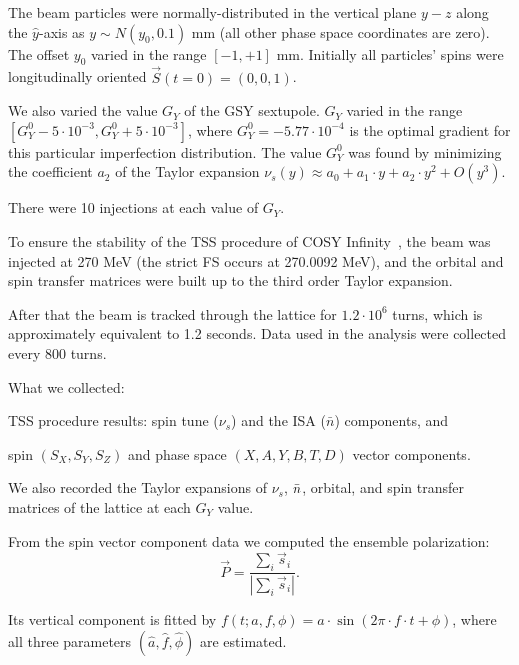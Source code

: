 The beam particles were normally-distributed in the vertical plane $y-z$ along the $\hat y$-axis
as $y\sim N(y_0, 0.1)$ mm (all other phase space coordinates are zero). The offset $y_0$ varied in the
range $[-1, +1]$ mm. Initially all particles' spins were longitudinally oriented $\vec S(t=0) = (0,0,1)$.

We also varied the value $G_Y$ of the GSY sextupole.
$G_Y$ varied in the range $[G_Y^0 - 5\cdot10^{-3}, G_Y^0 + 5\cdot10^{-3}]$, where
$G_Y^0=-5.77\cdot 10^{-4}$ is the optimal gradient for this particular imperfection distribution.
The value $G_Y^0$ was found by minimizing the coefficient $a_2$
of the Taylor expansion $\nu_s(y) \approx a_0 + a_1\cdot y + a_2\cdot y^2 + O(y^3)$.

There were 10 injections at each value of $G_Y$.

To ensure the stability of the TSS procedure of COSY Infinity~\cite{COSYINF:Manual:BeamPhys},
the beam was injected at 270 MeV (the strict FS occurs at 270.0092 MeV), and the orbital and
spin transfer matrices were built up to the third order Taylor expansion. 

After that the beam is tracked through the lattice for $1.2\cdot10^6$ turns, which is approximately
equivalent to 1.2 seconds. Data used in the analysis were collected every 800 turns.

What we collected:
\begin{enumerate*}
	\item TSS procedure results: spin tune ($\nu_s$)  and the ISA ($\bar n$) components, and
	\item spin $(S_X, S_Y, S_Z)$ and phase space $(X,A,Y,B,T,D)$ vector components.
\end{enumerate*}
We also recorded the Taylor expansions of $\nu_s$, $\bar n$, orbital, and spin transfer matrices
of the lattice at each $G_Y$ value.

From the spin vector component data we computed the ensemble polarization:
\begin{equation}\label{eq:polarization_formula}
\vec P = \frac{\sum_i\vec s_i}{|\sum_i\vec s_i|}.
\end{equation}

Its vertical component is fitted by $f(t; a,f,\phi) = a\cdot \sin(2\pi\cdot
f\cdot t + \phi)$, where all three parameters $(\hat a, \hat f, \hat\phi)$ are estimated.  

